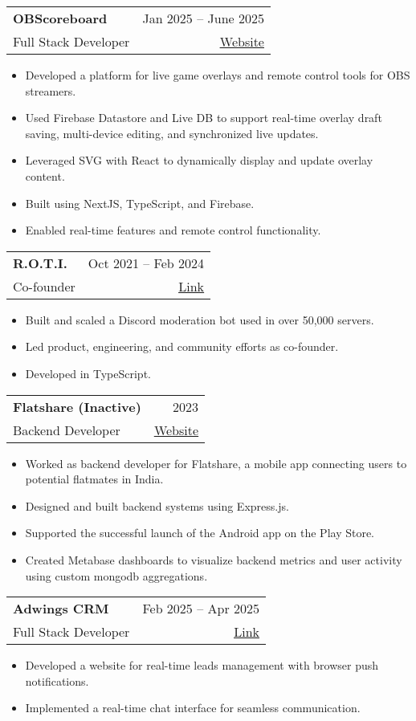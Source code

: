 \documentclass[A4,11pt]{article}
\makeatletter
\newcommand{\CVItem}[1]{
  \item\small{
    {#1 \vspace{-2pt}}
  }
}
\newcommand{\CVSubheading}[4]{
  \vspace{-2pt}\item
    \begin{tabular*}{0.97\textwidth}[t]{l@{\extracolsep{\fill}}r}
      \textbf{#1} & #2 \\
      \small#3 & \small #4 \\
    \end{tabular*}\vspace{-7pt}
}
\newcommand{\CVItemListStart}{\begin{itemize}}
\newcommand{\CVItemListEnd}{\end{itemize}\vspace{-5pt}}
\makeatother
\begin{document}
    \CVSubheading
      {OBScoreboard}{Jan 2025 -- June 2025}
      {Full Stack Developer}{\href{https://app.obscoreboard.com/}{\underline{\color{blue} Website}}}
      \CVItemListStart
        \CVItem{Developed a platform for live game overlays and remote control tools for OBS streamers.}
        \CVItem{Used Firebase Datastore and Live DB to support real-time overlay draft saving, multi-device editing, and synchronized live updates.}
        \CVItem{Leveraged SVG with React to dynamically display and update overlay content.}
        \CVItem{Built using NextJS, TypeScript, and Firebase.}
        \CVItem{Enabled real-time features and remote control functionality.}
      \CVItemListEnd

      \CVSubheading
        {R.O.T.I.}{Oct 2021 -- Feb 2024}
        {Co-founder}{\href{https://rotibot.xyz/}{\underline{\color{blue} Link}}}
        \CVItemListStart
          \CVItem{Built and scaled a Discord moderation bot used in over 50,000 servers.}
          \CVItem{Led product, engineering, and community efforts as co-founder.}
          \CVItem{Developed in TypeScript.}
        \CVItemListEnd

    \CVSubheading
      {Flatshare (Inactive)}{2023}
      {Backend Developer}{\href{https://joinflatshare.com/}{\underline{\color{blue} Website}}}
      \CVItemListStart
        \CVItem{Worked as backend developer for Flatshare, a mobile app connecting users to potential flatmates in India.}
        \CVItem{Designed and built backend systems using Express.js.}
        \CVItem{Supported the successful launch of the Android app on the Play Store.}
        \CVItem{Created Metabase dashboards to visualize backend metrics and user activity using custom mongodb aggregations.}
      \CVItemListEnd


      \CVSubheading
        {Adwings CRM}{Feb 2025 -- Apr 2025}
        {Full Stack Developer}{\href{https://adwingscrm.com/}{\underline{\color{blue} Link}}}
        \CVItemListStart
          \CVItem{Developed a website for real-time leads management with browser push notifications.}
          \CVItem{Implemented a real-time chat interface for seamless communication.}
        \CVItemListEnd
\end{document}
